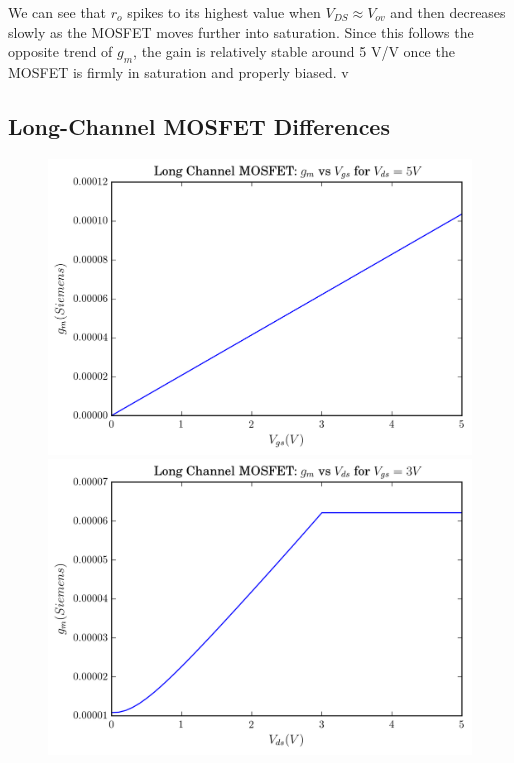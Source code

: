 \documentclass[11pt]{article}
\begin{document}
We can see that $r_o$ spikes to its highest value when $V_{DS} \approx V_{ov}$ and then decreases slowly as the MOSFET moves further into saturation. Since this follows the opposite trend of $g_m$, the gain is relatively stable around 5 V/V once the MOSFET is firmly in saturation and properly biased.
v
\subsection{Long-Channel MOSFET Differences}
\begin{figure}[H]
	\includegraphics[width=\linewidth]{images/long_channel_gm_vs_vgs.png}
	\endminipage\hfill
	\includegraphics[width=\linewidth]{images/long_channel_gm_vs_vds.png}
	\endminipage
\end{figure}
\end{document}
